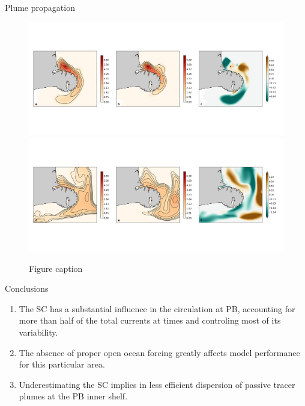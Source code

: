 \documentclass[final]{beamer}
\newlength{\onecolwid}
\begin{document}
\begin{frame}[t]
\begin{columns}[t]
\begin{column}{\onecolwid}
\begin{block}{Plume propagation}
    \begin{figure}
    \includegraphics[width=0.8\linewidth]{dye_concentration.png}\\
    \includegraphics[width=0.8\linewidth]{dye_concentration_last-day.png}
    \caption{\label{dye} Figure caption}
    \end{figure}

    \end{block}


    \begin{alertblock}{Conclusions}

    \begin{small}
    \begin{enumerate}
    \item The SC has a substantial influence in the circulation at PB, accounting for more than half of the total currents at times and controling most of its variability.
    \item The absence of proper open ocean forcing greatly affects model performance for this particular area.
    \item Underestimating the SC implies in less efficient dispersion of passive tracer plumes at the PB inner shelf. 
    \end{enumerate}
    \end{small}

    \end{alertblock}


\end{column}
\end{columns}
\end{frame}
\end{document}
